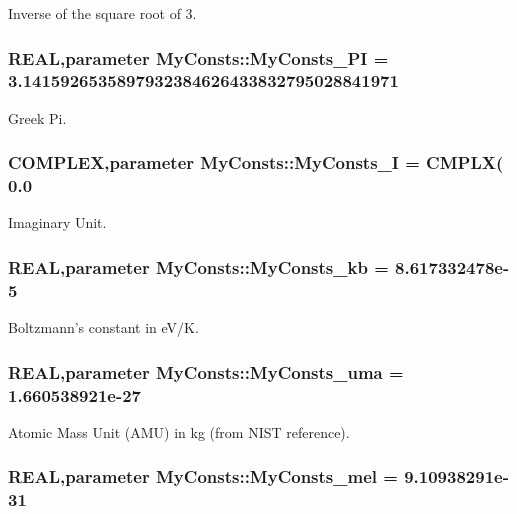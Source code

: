 Inverse of the square root of 3. \hypertarget{namespace_my_consts_a269bb97656a3220bb770f00b1a25bf4c}{
\subsubsection[{MyConsts\_\-PI}]{\setlength{\rightskip}{0pt plus 5cm}REAL,parameter {\bf MyConsts::MyConsts\_\-PI} = 3.1415926535897932384626433832795028841971}}
\label{namespace_my_consts_a269bb97656a3220bb770f00b1a25bf4c}


Greek Pi. \hypertarget{namespace_my_consts_ac8a82909a7db530fcc275af18b798094}{
\subsubsection[{MyConsts\_\-I}]{\setlength{\rightskip}{0pt plus 5cm}COMPLEX,parameter {\bf MyConsts::MyConsts\_\-I} = CMPLX( 0.0}}
\label{namespace_my_consts_ac8a82909a7db530fcc275af18b798094}


Imaginary Unit. \hypertarget{namespace_my_consts_a8ec037cf234b67a520136aaea3133b7c}{
\subsubsection[{MyConsts\_\-kb}]{\setlength{\rightskip}{0pt plus 5cm}REAL,parameter {\bf MyConsts::MyConsts\_\-kb} = 8.617332478e-\/5}}
\label{namespace_my_consts_a8ec037cf234b67a520136aaea3133b7c}


Boltzmann's constant in eV/K. \hypertarget{namespace_my_consts_a3b04681501dc44eeb3701aa7ee2f220e}{
\subsubsection[{MyConsts\_\-uma}]{\setlength{\rightskip}{0pt plus 5cm}REAL,parameter {\bf MyConsts::MyConsts\_\-uma} = 1.660538921e-\/27}}
\label{namespace_my_consts_a3b04681501dc44eeb3701aa7ee2f220e}


Atomic Mass Unit (AMU) in kg (from NIST reference). \hypertarget{namespace_my_consts_aa1367128efaba1f65ead2ceb9f64db46}{
\subsubsection[{MyConsts\_\-mel}]{\setlength{\rightskip}{0pt plus 5cm}REAL,parameter {\bf MyConsts::MyConsts\_\-mel} = 9.10938291e-\/31}}
\label{namespace_my_consts_aa1367128efaba1f65ead2ceb9f64db46}


